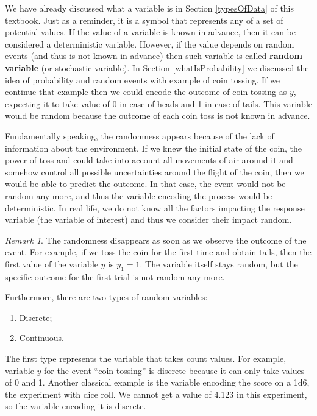 \documentclass[
]{book}
\providecommand{\tightlist}{%
  \setlength{\itemsep}{0pt}\setlength{\parskip}{0pt}}
\theoremstyle{definition}
\theoremstyle{definition}
\theoremstyle{definition}
\theoremstyle{definition}
\theoremstyle{remark}
\newtheorem*{remark}{Remark}
\begin{document}
We have already discussed what a variable is in Section \ref{typesOfData} of this textbook. Just as a reminder, it is a symbol that represents any of a set of potential values. If the value of a variable is known in advance, then it can be considered a deterministic variable. However, if the value depends on random events (and thus is not known in advance) then such variable is called \textbf{random variable} (or stochastic variable). In Section \ref{whatIsProbability} we discussed the idea of probability and random events with example of coin tossing. If we continue that example then we could encode the outcome of coin tossing as \(y\), expecting it to take value of 0 in case of heads and 1 in case of tails. This variable would be random because the outcome of each coin toss is not known in advance.

Fundamentally speaking, the randomness appears because of the lack of information about the environment. If we knew the initial state of the coin, the power of toss and could take into account all movements of air around it and somehow control all possible uncertainties around the flight of the coin, then we would be able to predict the outcome. In that case, the event would not be random any more, and thus the variable encoding the process would be deterministic. In real life, we do not know all the factors impacting the response variable (the variable of interest) and thus we consider their impact random.

\begin{remark}
The randomness disappears as soon as we observe the outcome of the event. For example, if we toss the coin for the first time and obtain tails, then the first value of the variable \(y\) is \(y_1=1\). The variable itself stays random, but the specific outcome for the first trial is not random any more.
\end{remark}

Furthermore, there are two types of random variables:

\begin{enumerate}
\def\labelenumi{\arabic{enumi}.}
\tightlist
\item
  Discrete;
\item
  Continuous.
\end{enumerate}

The first type represents the variable that takes count values. For example, variable \(y\) for the event ``coin tossing'' is discrete because it can only take values of 0 and 1. Another classical example is the variable encoding the score on a 1d6, the experiment with dice roll. We cannot get a value of 4.123 in this experiment, so the variable encoding it is discrete.
\end{document}
